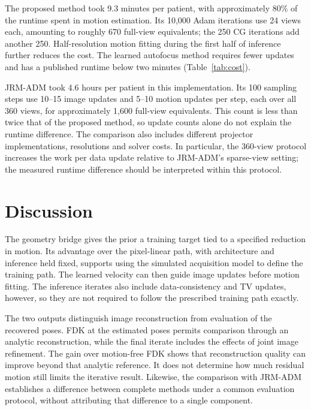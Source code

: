 \documentclass[11pt]{article}
\begin{document}
The proposed method took 9.3 minutes per patient, with approximately 80\% of the
runtime spent in motion estimation. Its 10,000 Adam iterations use 24 views each,
amounting to roughly 670 full-view equivalents; the 250 CG iterations add another
250. Half-resolution motion fitting during the first half of inference further reduces
the cost. The learned autofocus method requires fewer updates and has a published
runtime below two minutes (Table~\ref{tab:cost}).

JRM-ADM took 4.6 hours per patient in this implementation. Its 100 sampling steps
use 10--15 image updates and 5--10 motion updates per step, each over all 360 views,
for approximately 1,600 full-view equivalents. This count is less than twice that of
the proposed method, so update counts alone do not explain the runtime difference.
The comparison also includes different projector implementations, resolutions and
solver costs. In particular, the 360-view protocol increases the work per data update
relative to JRM-ADM's sparse-view setting; the measured runtime difference should be
interpreted within this protocol.

\FloatBarrier
\section{Discussion}
\label{sec:discussion}

The geometry bridge gives the prior a training target tied to a specified reduction in
motion. Its advantage over the pixel-linear path, with architecture and inference held
fixed, supports using the simulated acquisition model to define the training path.
The learned velocity can then guide image updates before motion fitting. The inference
iterates also include data-consistency and TV updates, however, so they are not required
to follow the prescribed training path exactly.

The two outputs distinguish image reconstruction from evaluation of the recovered poses.
FDK at the estimated poses permits comparison through an analytic reconstruction,
while the final iterate includes the effects of joint image refinement. The gain over
motion-free FDK shows that reconstruction quality can improve beyond that analytic
reference. It does not determine how much residual motion still limits the iterative
result. Likewise, the comparison with JRM-ADM establishes a difference between complete
methods under a common evaluation protocol, without attributing that difference to a
single component.
\end{document}
